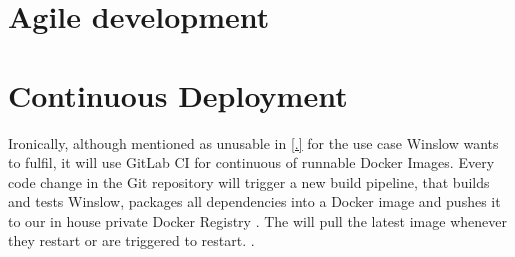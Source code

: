 \section{Agile development}



\section{Continuous Deployment}

Ironically, although mentioned as unusable in \autoref{.} for the use case Winslow wants to fulfil, it will use GitLab CI for continuous  of runnable Docker Images.
Every code change in the Git repository will trigger a new build pipeline, that builds and tests Winslow, packages all dependencies  into a Docker image and pushes it to our in house private Docker Registry .
The  will pull the latest image whenever they restart or are triggered to restart.
\todo.